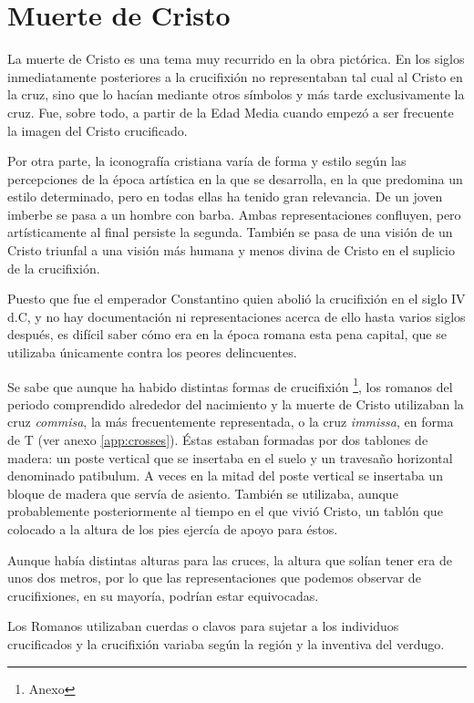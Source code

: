 \section{Muerte de Cristo}
La muerte de Cristo es una tema muy recurrido en la obra pictórica. En los siglos inmediatamente posteriores a la crucifixión no representaban tal cual al Cristo en la cruz, sino que lo hacían mediante otros símbolos y más tarde exclusivamente la cruz. Fue, sobre todo, a partir de la Edad Media cuando empezó a ser frecuente la imagen del Cristo crucificado.

Por otra parte, la iconografía cristiana varía de forma y estilo según las percepciones de la época artística en la que se desarrolla, en la que predomina un estilo determinado, pero en todas ellas ha tenido gran relevancia. De un joven imberbe se pasa a un hombre con barba. Ambas representaciones confluyen, pero artísticamente al final persiste la segunda. También se pasa de una visión de un Cristo triunfal a una visión más humana y menos divina de Cristo en el suplicio de la crucifixión.

Puesto que fue el emperador Constantino quien abolió la crucifixión en el siglo IV d.C, y no hay documentación ni representaciones acerca de ello hasta varios siglos después, es difícil saber cómo era en la época romana esta pena capital, que se utilizaba únicamente contra los peores delincuentes.

Se sabe que aunque ha habido distintas formas de crucifixión \footnote{Anexo}, los romanos del periodo comprendido alrededor del nacimiento y la muerte de Cristo utilizaban la cruz \textit{commisa}, la más frecuentemente representada, o la cruz \textit{immissa}, en forma de T (ver anexo \autoref{app:crosses}). Éstas estaban formadas por dos tablones de madera: un poste vertical que se insertaba en el suelo y un travesaño horizontal denominado patibulum. A veces en la mitad del poste vertical se insertaba un bloque de madera que servía de asiento. También se utilizaba, aunque probablemente posteriormente al tiempo en el que vivió Cristo, un tablón que colocado a la altura de los pies ejercía de apoyo para éstos.

Aunque había distintas alturas para las cruces, la altura que solían tener era de unos dos metros, por lo que las representaciones que podemos observar de crucifixiones, en su mayoría, podrían estar equivocadas.

Los Romanos utilizaban cuerdas o clavos para sujetar a los individuos crucificados y la crucifixión variaba según la región y la inventiva del verdugo.

